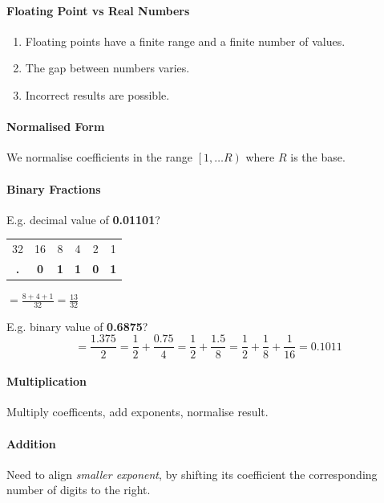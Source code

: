 \documentclass[twocolumn,english]{article}
\providecommand{\tabularnewline}{\\}
\begin{document}
\paragraph{Floating Point vs Real Numbers}
\begin{enumerate}
\item Floating points have a finite range and a finite number of values.
\item The gap between numbers varies.
\item Incorrect results are possible.
\end{enumerate}

\paragraph{Normalised Form}

We normalise coefficients in the range $\left[1,\dots R\right)$ where
$R$ is the base.


\paragraph{Binary Fractions}

E.g. decimal value of \textbf{0.01101}?

\begin{table}[H]
\noindent \centering{}%
\begin{tabular}{cccccc}
\toprule 
32 & 16 & 8 & 4 & 2 & 1\tabularnewline
\textbf{.} & \textbf{0} & \textbf{1} & \textbf{1} & \textbf{0} & \textbf{1}\tabularnewline
\bottomrule
\end{tabular}$=\frac{8+4+1}{32}=\frac{13}{32}$
\end{table}


E.g. binary value of \textbf{0.6875}?
\[
=\frac{1.375}{2}=\frac{1}{2}+\frac{0.75}{4}=\frac{1}{2}+\frac{1.5}{8}=\frac{1}{2}+\frac{1}{8}+\frac{1}{16}=0.1011
\]



\paragraph{Multiplication}

Multiply coefficents, add exponents, normalise result.


\paragraph{Addition}

Need to align \emph{smaller exponent}, by shifting its coefficient
the corresponding number of digits to the right.
\end{document}
